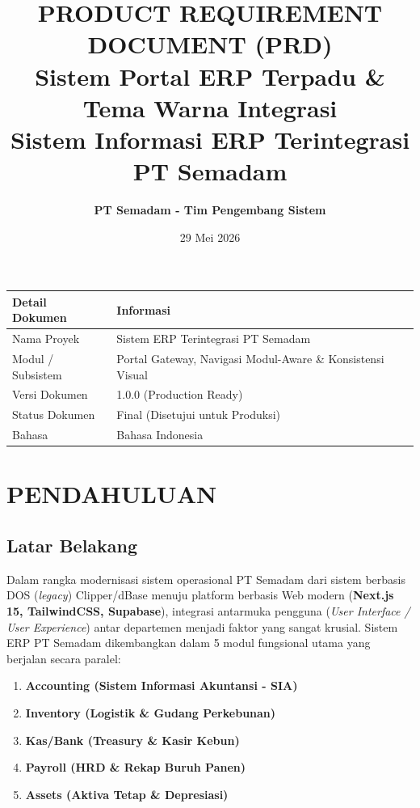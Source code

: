 \documentclass[11pt,a4paper]{article}
\title{
    \vspace{-1.5cm}
    \color{primarycolor}\textbf{\Huge PRODUCT REQUIREMENT DOCUMENT (PRD)}\\
    \vspace{0.3cm}
    \color{secondarycolor}\Large\textbf{Sistem Portal ERP Terpadu \& Tema Warna Integrasi}\\
    \vspace{0.2cm}
    \large\textbf{Sistem Informasi ERP Terintegrasi PT Semadam}
}
\author{\textbf{PT Semadam - Tim Pengembang Sistem}}
\date{29 Mei 2026}
\begin{document}
\maketitle

\thispagestyle{empty}
\begin{center}
    \vspace{1.5cm}
    \begin{tabular}{ll}
        \toprule
        \textbf{Detail Dokumen} & \textbf{Informasi} \\
        \midrule
        Nama Proyek & Sistem ERP Terintegrasi PT Semadam \\
        Modul / Subsistem & Portal Gateway, Navigasi Modul-Aware \& Konsistensi Visual \\
        Versi Dokumen & 1.0.0 (Production Ready) \\
        Status Dokumen & Final (Disetujui untuk Produksi) \\
        Bahasa & Bahasa Indonesia \\
        \bottomrule
    \end{tabular}
\end{center}

\newpage
\tableofcontents
\newpage

\section{PENDAHULUAN}

\subsection{Latar Belakang}
Dalam rangka modernisasi sistem operasional PT Semadam dari sistem berbasis DOS (\textit{legacy}) Clipper/dBase menuju platform berbasis Web modern (\textbf{Next.js 15, TailwindCSS, Supabase}), integrasi antarmuka pengguna (\textit{User Interface / User Experience}) antar departemen menjadi faktor yang sangat krusial. Sistem ERP PT Semadam dikembangkan dalam 5 modul fungsional utama yang berjalan secara paralel:
\begin{enumerate}
    \item \textbf{Accounting (Sistem Informasi Akuntansi - SIA)}
    \item \textbf{Inventory (Logistik \& Gudang Perkebunan)}
    \item \textbf{Kas/Bank (Treasury \& Kasir Kebun)}
    \item \textbf{Payroll (HRD \& Rekap Buruh Panen)}
    \item \textbf{Assets (Aktiva Tetap \& Depresiasi)}
\end{enumerate}
\end{document}
